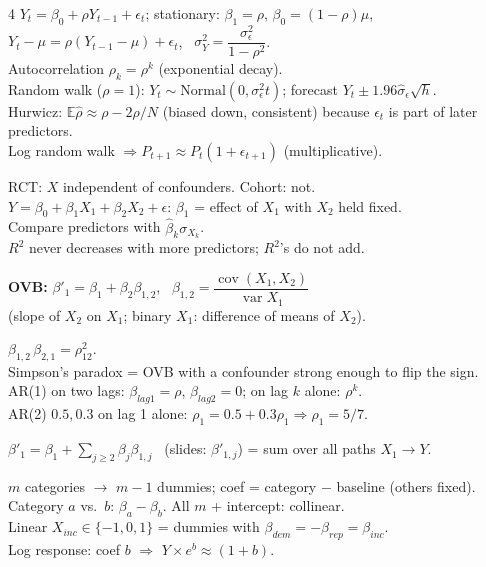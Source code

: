 \documentclass[11pt]{article}
\newcommand{\E}{\mathbb{E}}
\newcommand{\Var}{\operatorname{var}}
\newcommand{\Cov}{\operatorname{cov}}
\newcommand{\Norm}{\text{Normal}}
\begin{document}
\begin{landscape}
\begin{multicols}{4}
$Y_t=\beta_0+\rho Y_{t-1}+\epsilon_t$; stationary: $\beta_1=\rho$, $\beta_0=(1-\rho)\mu$,\\
$Y_t-\mu=\rho(Y_{t-1}-\mu)+\epsilon_t$, \ $\sigma_Y^2=\dfrac{\sigma_\epsilon^2}{1-\rho^2}$.\\
Autocorrelation $\rho_k=\rho^k$ (exponential decay).\\
Random walk ($\rho=1$): $Y_t\sim\Norm(0,\sigma_\epsilon^2t)$; forecast $Y_t\pm1.96\hat\sigma_\epsilon\sqrt h$.\\
Hurwicz: $\E\hat\rho\approx\rho-2\rho/N$ (biased down, consistent) because $\epsilon_t$ is part of later predictors.\\
Log random walk $\Rightarrow P_{t+1}\approx P_t(1+\epsilon_{t+1})$ (multiplicative).

RCT: $X$ independent of confounders. Cohort: not.\\
$Y=\beta_0+\beta_1X_1+\beta_2X_2+\epsilon$: $\beta_1$ = effect of $X_1$ with $X_2$ held fixed.\\
Compare predictors with $\hat\beta_k\sigma_{X_k}$.\\
$R^2$ never decreases with more predictors; $R^2$'s do not add.
\begin{cbox}
\textbf{OVB:} $\beta'_1=\beta_1+\beta_2\beta_{1,2}$, \ $\beta_{1,2}=\dfrac{\Cov(X_1,X_2)}{\Var X_1}$\\
(slope of $X_2$ on $X_1$; binary $X_1$: difference of means of $X_2$).
\end{cbox}
$\beta_{1,2}\,\beta_{2,1}=\rho_{12}^2$.\\
Simpson's paradox = OVB with a confounder strong enough to flip the sign.\\
AR(1) on two lags: $\beta_{lag1}=\rho$, $\beta_{lag2}=0$; on lag $k$ alone: $\rho^k$.\\
AR(2) $0.5,0.3$ on lag 1 alone: $\rho_1=0.5+0.3\rho_1\Rightarrow\rho_1=5/7$.

\begin{cbox}
$\beta'_1=\beta_1+\sum_{j\ge2}\beta_j\beta_{1,j}$ \ (slides: $\beta'_{1,j}$) = sum over all paths $X_1\to Y$.
\end{cbox}
$m$ categories $\to$ $m-1$ dummies; coef = category $-$ baseline (others fixed).\\
Category $a$ vs.\ $b$: $\beta_a-\beta_b$. All $m$ + intercept: collinear.\\
Linear $X_{inc}\in\{-1,0,1\}$ = dummies with $\beta_{dem}=-\beta_{rep}=\beta_{inc}$.\\
Log response: coef $b$ $\Rightarrow$ $Y\times e^b\approx(1+b)$.


\end{multicols}
\end{landscape}
\end{document}

